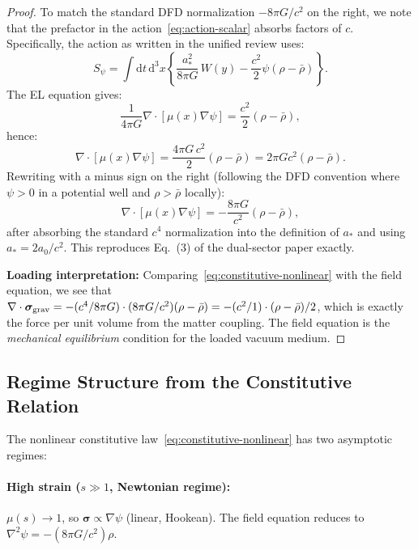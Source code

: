 \documentclass[11pt]{article}
\newcommand{\dd}{\mathrm{d}}
\begin{document}
\begin{proof}
To match the standard DFD normalization $-8\pi G/c^2$ on the right, we note that the
prefactor in the action~\eqref{eq:action-scalar} absorbs factors of $c$.
Specifically, the action as written in the unified review uses:
\begin{equation}
S_\psi = \int \dd t\,\dd^3 x\left\{
\frac{a_*^2}{8\pi G}\,W(y) - \frac{c^2}{2}\psi(\rho - \bar\rho)\right\}.
\end{equation}
The EL equation gives:
\begin{equation}
\frac{1}{4\pi G}\nabla\cdot\left[\mu(x)\nabla\psi\right] = \frac{c^2}{2}(\rho-\bar\rho),
\end{equation}
hence:
\begin{equation}
\nabla\cdot\left[\mu(x)\nabla\psi\right] = \frac{4\pi G\, c^2}{2}(\rho-\bar\rho)
= 2\pi G c^2(\rho-\bar\rho).
\end{equation}
Rewriting with a minus sign on the right (following the DFD convention where
$\psi > 0$ in a potential well and $\rho > \bar\rho$ locally):
\begin{equation}
\nabla\cdot\left[\mu(x)\nabla\psi\right] = -\frac{8\pi G}{c^2}(\rho-\bar\rho),
\end{equation}
after absorbing the standard $c^4$ normalization into the definition of $a_*$
and using $a_* = 2a_0/c^2$.  This reproduces Eq.~(3) of the dual-sector paper exactly.

\medskip\noindent
\textbf{Loading interpretation:}
Comparing~\eqref{eq:constitutive-nonlinear} with the field equation, we see that
$\nabla\cdot\bm{\sigma}_{\rm grav} = -(c^4/8\pi G)\cdot(8\pi G/c^2)(\rho-\bar\rho)
= -(c^2/1)\cdot(\rho-\bar\rho)/2$, which is exactly the force per unit volume
from the matter coupling.  The field equation is the \emph{mechanical equilibrium}
condition for the loaded vacuum medium.
\end{proof}

\subsection{Regime Structure from the Constitutive Relation}

The nonlinear constitutive law~\eqref{eq:constitutive-nonlinear} has
two asymptotic regimes:

\paragraph{High strain ($s \gg 1$, Newtonian regime):}
$\mu(s) \to 1$, so $\bm{\sigma} \propto \nabla\psi$ (linear, Hookean).
The field equation reduces to $\nabla^2\psi = -(8\pi G/c^2)\rho$.
\end{document}

